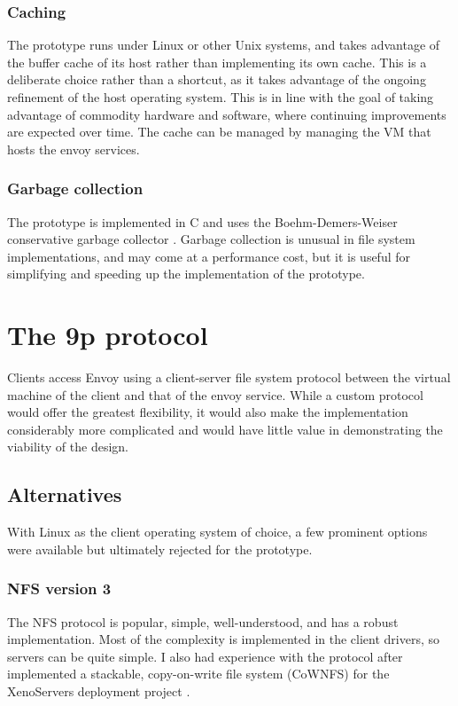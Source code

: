 \subsubsection{Caching}

The prototype runs under Linux or other Unix systems, and takes advantage of the buffer cache of its host rather than implementing its own cache. This is a deliberate choice rather than a shortcut, as it takes advantage of the ongoing refinement of the host operating system. This is in line with the goal of taking advantage of commodity hardware and software, where continuing improvements are expected over time. The cache can be managed by managing the VM that hosts the envoy services.

\subsubsection{Garbage collection}

The prototype is implemented in C and uses the Boehm-Demers-Weiser conservative garbage collector \cite{boehm}. Garbage collection is unusual in file system implementations, and may come at a performance cost, but it is useful for simplifying and speeding up the implementation of the prototype.

\section{The 9p protocol}

Clients access Envoy using a client-server file system protocol between the virtual machine of the client and that of the envoy service. While a custom protocol would offer the greatest flexibility, it would also make the implementation considerably more complicated and would have little value in demonstrating the viability of the design.

\subsection{Alternatives}

With Linux as the client operating system of choice, a few prominent options were available but ultimately rejected for the prototype.

\subsubsection{NFS version 3}

The NFS protocol is popular, simple, well-understood, and has a robust implementation. Most of the complexity is implemented in the client drivers, so servers can be quite simple. I also had experience with the protocol after implemented a stackable, copy-on-write file system (CoWNFS) for the XenoServers deployment project \cite{kotsovinos}.

